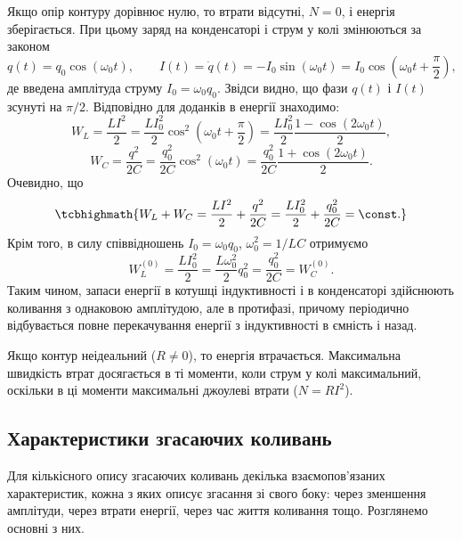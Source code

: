 Якщо опір контуру дорівнює нулю, то втрати відсутні,
$N = 0$, і енергія зберігається. При цьому заряд на конденсаторі і струм у
колі змінюються за законом
\begin{equation}\label{eq:lossless_oscillations}
	q(t) = q_0 \cos(\omega_0 t), \qquad
	I(t) = \dot{q}(t) = -I_0 \sin(\omega_0 t) = I_0 \cos\left(\omega_0 t + \frac{\pi}{2}\right),
\end{equation}
де введена амплітуда струму $I_0 = \omega_0 q_0$. Звідси видно, що фази $q(t)$ і
$I(t)$ зсунуті на $\pi/2$. Відповідно для доданків в енергії знаходимо:
\begin{equation}\label{eq:WL_WC_oscillations}
	W_L = \frac{LI^2}{2} = \frac{LI_0^2}{2} \cos^2\left(\omega_0 t + \frac{\pi}{2}\right) = \frac{LI_0^2}{2} \frac{1 - \cos(2\omega_0 t)}{2},
\end{equation}
\begin{equation}\label{eq:WC_oscillations}
	W_C = \frac{q^2}{2C} = \frac{q_0^2}{2C} \cos^2(\omega_0 t) = \frac{q_0^2}{2C} \frac{1 + \cos(2\omega_0 t)}{2}.
\end{equation}
Очевидно, що
\begin{equation}\label{eq:energy_conservation}
	\tcbhighmath{
		W_L + W_C = \frac{LI^2}{2} + \frac{q^2}{2C} = \frac{LI_0^2}{2} + \frac{q_0^2}{2C} = \const.
	}
\end{equation}
Крім того, в силу співвідношень $I_0 = \omega_0 q_0$, $\omega_0^2 = 1/LC$ отримуємо
\begin{equation}\label{eq:energy_amplitudes}
	W_L^{(0)} = \frac{LI_0^2}{2} = \frac{L\omega_0^2}{2} q_0^2 = \frac{q_0^2}{2C} = W_C^{(0)}.
\end{equation}
Таким чином, запаси енергії в котушці індуктивності і в конденсаторі здійснюють коливання з однаковою амплітудою, але в протифазі,
причому періодично відбувається повне перекачування енергії з індуктивності в ємність і назад.

Якщо контур неідеальний ($R \neq 0$), то енергія втрачається. Максимальна швидкість втрат досягається в ті моменти, коли струм у колі
максимальний, оскільки в ці моменти максимальні джоулеві втрати
($N = RI^2$).

\subsection*{Характеристики згасаючих коливань}

Для кількісного опису згасаючих коливань декілька взаємопов'язаних характеристик, кожна з яких описує згасання зі свого боку: через зменшення амплітуди, через втрати енергії, через час життя коливання тощо. Розглянемо основні з них.

